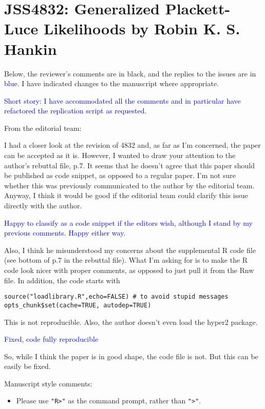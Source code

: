 \documentclass[12pt]{article}
\begin{document}
\section*{JSS4832: Generalized Plackett-Luce Likelihoods by Robin
K. S. Hankin}


Below, the reviewer's comments are in black, and the replies to the
issues are in \textcolor{blue}{blue}.  I have indicated changes to
the manuscript where appropriate.

\textcolor{blue}{Short story: I have accommodated all the comments and
  in particular have refactored the replication script as requested.}

From the editorial team:

I had a closer look at the revision of 4832 and, as far as I'm
concerned, the paper can be accepted as it is. However, I wanted to
draw your attention to the author's rebuttal file, p.7. It seems that
he doesn't agree that this paper should be published as code snippet,
as opposed to a regular paper. I'm not sure whether this was
previously communicated to the author by the editorial team. Anyway, I
think it would be good if the editorial team could clarify this issue
directly with the author.

\textcolor{blue}{Happy to classify as a code snippet if the editors
  wish, although I stand by my previous comments.  Happy either way.}


Also, I think he misunderstood my concerns about the supplemental R
code file (see bottom of p.7 in the rebuttal file). What I'm asking
for is to make the R code look nicer with proper comments, as opposed
to just pull it from the Rnw file. In addition, the code starts with


\begin{verbatim}
source("loadlibrary.R",echo=FALSE) # to avoid stupid messages
opts_chunk$set(cache=TRUE, autodep=TRUE)
\end{verbatim}

This is not reproducible. Also, the author doesn't even load the hyper2 package.

\textcolor{blue}{Fixed, code fully reproducible}

So, while I think the paper is in good shape, the code file is not. But this can be easily be fixed.

Manuscript style comments:

\begin{itemize}
  \item Please use \verb+"R>"+ as the command prompt, rather than \verb+">"+.
\end{itemize}
    
\end{document}
